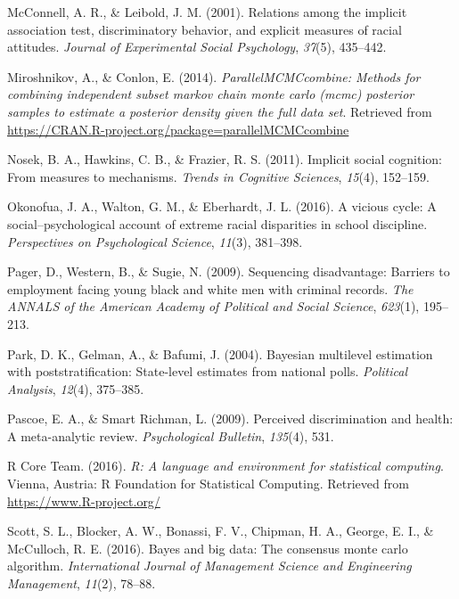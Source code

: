 \documentclass[english,floatsintext,man]{apa6}
\theoremstyle{definition}
\theoremstyle{definition}
\theoremstyle{remark}
\begin{document}
\hypertarget{ref-mcconnell2001relations}{}
McConnell, A. R., \& Leibold, J. M. (2001). Relations among the implicit
association test, discriminatory behavior, and explicit measures of
racial attitudes. \emph{Journal of Experimental Social Psychology},
\emph{37}(5), 435--442.

\hypertarget{ref-miroshnikov2014parallel}{}
Miroshnikov, A., \& Conlon, E. (2014). \emph{ParallelMCMCcombine:
Methods for combining independent subset markov chain monte carlo (mcmc)
posterior samples to estimate a posterior density given the full data
set}. Retrieved from
\url{https://CRAN.R-project.org/package=parallelMCMCcombine}

\hypertarget{ref-nosek2011implicit}{}
Nosek, B. A., Hawkins, C. B., \& Frazier, R. S. (2011). Implicit social
cognition: From measures to mechanisms. \emph{Trends in Cognitive
Sciences}, \emph{15}(4), 152--159.

\hypertarget{ref-okonofua2016vicious}{}
Okonofua, J. A., Walton, G. M., \& Eberhardt, J. L. (2016). A vicious
cycle: A social--psychological account of extreme racial disparities in
school discipline. \emph{Perspectives on Psychological Science},
\emph{11}(3), 381--398.

\hypertarget{ref-pager2009sequencing}{}
Pager, D., Western, B., \& Sugie, N. (2009). Sequencing disadvantage:
Barriers to employment facing young black and white men with criminal
records. \emph{The ANNALS of the American Academy of Political and
Social Science}, \emph{623}(1), 195--213.

\hypertarget{ref-park2004bayesian}{}
Park, D. K., Gelman, A., \& Bafumi, J. (2004). Bayesian multilevel
estimation with poststratification: State-level estimates from national
polls. \emph{Political Analysis}, \emph{12}(4), 375--385.

\hypertarget{ref-pascoe2009perceived}{}
Pascoe, E. A., \& Smart Richman, L. (2009). Perceived discrimination and
health: A meta-analytic review. \emph{Psychological Bulletin},
\emph{135}(4), 531.

\hypertarget{ref-rcitation}{}
R Core Team. (2016). \emph{R: A language and environment for statistical
computing}. Vienna, Austria: R Foundation for Statistical Computing.
Retrieved from \url{https://www.R-project.org/}

\hypertarget{ref-scott2016bayes}{}
Scott, S. L., Blocker, A. W., Bonassi, F. V., Chipman, H. A., George, E.
I., \& McCulloch, R. E. (2016). Bayes and big data: The consensus monte
carlo algorithm. \emph{International Journal of Management Science and
Engineering Management}, \emph{11}(2), 78--88.
\end{document}
